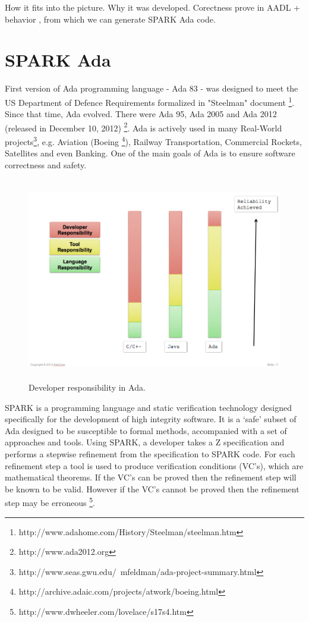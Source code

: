 How it fits into the picture. Why it was developed. Corectness prove in AADL + behavior \cite{Bless:Paper}, from which we can generate SPARK Ada code.



\section{SPARK Ada}
\label{background:spark}

First version of Ada programming language - Ada 83 - was designed to meet the US Department of Defence Requirements formalized in "Steelman" document \footnote{http://www.adahome.com/History/Steelman/steelman.htm}. Since that time, Ada evolved. There were Ada 95, Ada 2005 and Ada 2012 (released in December 10, 2012) \footnote{http://www.ada2012.org}. Ada is actively used in many Real-World projects\footnote{http://www.seas.gwu.edu/~mfeldman/ada-project-summary.html}, e.g. Aviation (Boeing \footnote{http://archive.adaic.com/projects/atwork/boeing.html}), Railway Transportation, Commercial Rockets, Satellites and even Banking. One of the main goals of Ada is to ensure software correctness and safety.

\begin{figure}[ht]%
    \begin{center}
    	\includegraphics[height=3.5in]{figures/developer_responsibility_in_ada.png}
    	\caption{Developer responsibility in Ada\protect\footnotemark. }    	
    \end{center}
\end{figure}

SPARK is a programming language and static verification technology designed specifically for the development of high integrity software. It is a `safe' subset of Ada designed to be susceptible to formal methods, accompanied with a set of approaches and tools. Using SPARK, a developer takes a Z specification and performs a stepwise refinement from the specification to SPARK code. For each refinement step a tool is used to produce verification conditions (VC's), which are mathematical theorems. If the VC's can be proved then the refinement step will be known to be valid. However if the VC's cannot be proved then the refinement step may be erroneous \footnote{http://www.dwheeler.com/lovelace/s17s4.htm}.

